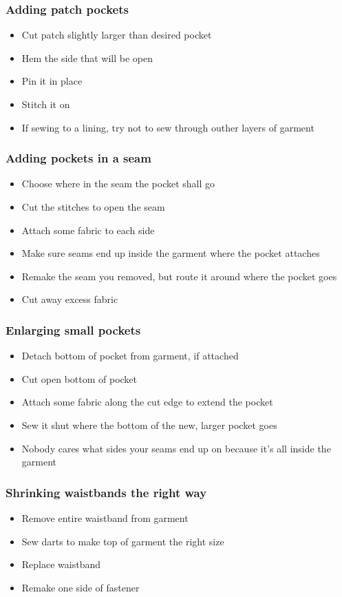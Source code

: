 \documentclass{beamer}
\begin{document}
\begin{frame}[fragile]
\frametitle{Adding patch pockets}
\begin{itemize}[<+(1)->]
\item Cut patch slightly larger than desired pocket
\item Hem the side that will be open
\item Pin it in place
\item Stitch it on
\item If sewing to a lining, try not to sew through outher layers of garment
\end{itemize}
\end{frame}

\begin{frame}[fragile]
\frametitle{Adding pockets in a seam}
\begin{itemize}[<+(1)->]
\item Choose where in the seam the pocket shall go
\item Cut the stitches to open the seam
\item Attach some fabric to each side
\item Make sure seams end up inside the garment where the pocket attaches
\item Remake the seam you removed, but route it around where the pocket goes
\item Cut away excess fabric
\end{itemize}
\end{frame}

\begin{frame}[fragile]
\frametitle{Enlarging small pockets}
\begin{itemize}[<+(1)->]
\item Detach bottom of pocket from garment, if attached
\item Cut open bottom of pocket
\item Attach some fabric along the cut edge to extend the pocket
\item Sew it shut where the bottom of the new, larger pocket goes
\item Nobody cares what sides your seams end up on because it's all inside the garment
\end{itemize}
\end{frame}

\begin{frame}[fragile]
\frametitle{Shrinking waistbands the right way}
\begin{itemize}[<+(1)->]
\item Remove entire waistband from garment
\item Sew darts to make top of garment the right size
\item Replace waistband
\item Remake one side of fastener
\end{itemize}
\end{frame}
\end{document}
